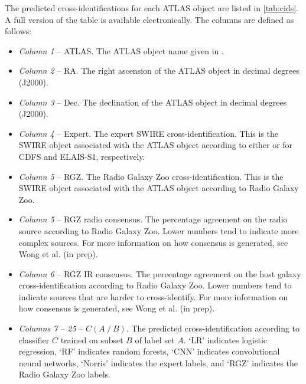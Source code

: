 \documentclass[fleqn,usenatbib,usedcolumn]{mnras}
\begin{document}
  The predicted cross-identifications for each ATLAS object are listed in
  \autoref{tab:cids}. A full version of the table is available electronically.
  The columns are defined as follows:
  \begin{itemize}
    \item {\em Column 1}  -- ATLAS. The ATLAS object name given in \citet{franzen15}.
    \item {\em Column 2} -- RA. The right ascension of the ATLAS object in decimal degrees (J2000).
    \item {\em Column 3} -- Dec. The declination of the ATLAS object in decimal degrees (J2000).
    \item {\em Column 4} -- Expert. The expert SWIRE cross-identification.
      This is the SWIRE object associated with the ATLAS object according to
      either \citet{norris06} or \citet{middelberg08} for CDFS and ELAIS-S1,
      respectively.
    \item {\em Column 5} -- RGZ. The Radio Galaxy Zoo cross-identification.
      This is the SWIRE object associated with the ATLAS object according to
      Radio Galaxy Zoo.
    \item {\em Column 5} -- RGZ radio consensus. The percentage agreement on
      the radio source according to Radio Galaxy Zoo. Lower numbers tend to
      indicate more complex sources. For more information on how consensus is
      generated, see Wong et al. (in prep).
    \item {\em Column 6} -- RGZ IR consensus. The percentage agreement on
      the host galaxy cross-identification according to Radio Galaxy Zoo.
      Lower numbers tend to indicate sources that are harder to
      cross-identify. For more information on how consensus is generated, see Wong et al. (in prep).
    \item {\em Columns 7 -- 25} -- $C(A\ /\ B)$. The predicted
      cross-identification according to classifier $C$ trained on subset $B$
      of label set $A$. `LR' indicates logistic regression, `RF' indicates
      random forests, `CNN' indicates convolutional neural networks, `Norris'
      indicates the expert labels, and `RGZ' indicates the Radio Galaxy Zoo
      labels.
  \end{itemize}

\bsp	%
\label{lastpage}
\end{document}

